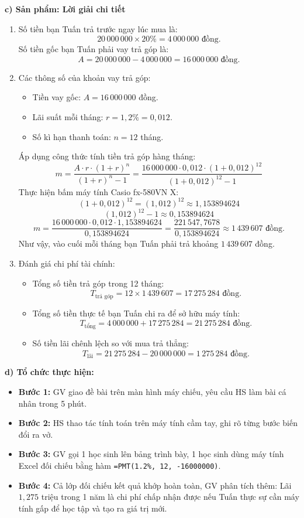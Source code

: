 \documentclass[12pt, a4paper]{article}
\begin{document}
\noindent \textbf{c) Sản phẩm: Lời giải chi tiết}
\begin{enumerate}
    \item Số tiền bạn Tuấn trả trước ngay lúc mua là:
    $$20\,000\,000 \times 20\% = 4\,000\,000\text{ đồng.}$$
    Số tiền gốc bạn Tuấn phải vay trả góp là:
    $$A = 20\,000\,000 - 4\,000\,000 = 16\,000\,000\text{ đồng.}$$
    \item Các thông số của khoản vay trả góp:
    \begin{itemize}
        \item Tiền vay gốc: $A = 16\,000\,000$ đồng.
        \item Lãi suất mỗi tháng: $r = 1{,}2\% = 0{,}012$.
        \item Số kì hạn thanh toán: $n = 12$ tháng.
    \end{itemize}
    Áp dụng công thức tính tiền trả góp hàng tháng:
    $$m = \dfrac{A \cdot r \cdot (1+r)^n}{(1+r)^n - 1} = \dfrac{16\,000\,000 \cdot 0{,}012 \cdot (1 + 0{,}012)^{12}}{(1 + 0{,}012)^{12} - 1}$$
    Thực hiện bấm máy tính Casio fx-580VN X:
    $$(1 + 0{,}012)^{12} = (1{,}012)^{12} \approx 1{,}153894624$$
    $$(1{,}012)^{12} - 1 \approx 0{,}153894624$$
    $$m = \dfrac{16\,000\,000 \cdot 0{,}012 \cdot 1{,}153894624}{0{,}153894624} = \dfrac{221\,547{,}7678}{0{,}153894624} \approx 1\,439\,607\text{ đồng.}$$
    Như vậy, vào cuối mỗi tháng bạn Tuấn phải trả khoảng $1\,439\,607$ đồng.
    \item Đánh giá chi phí tài chính:
    \begin{itemize}
        \item Tổng số tiền trả góp trong 12 tháng:
        $$T_{\text{trả góp}} = 12 \times 1\,439\,607 = 17\,275\,284\text{ đồng.}$$
        \item Tổng số tiền thực tế bạn Tuấn chi ra để sở hữu máy tính:
        $$T_{\text{tổng}} = 4\,000\,000 + 17\,275\,284 = 21\,275\,284\text{ đồng.}$$
        \item Số tiền lãi chênh lệch so với mua trả thẳng:
        $$T_{\text{lãi}} = 21\,275\,284 - 20\,000\,000 = 1\,275\,284\text{ đồng.}$$
    \end{itemize}
\end{enumerate}

\noindent \textbf{d) Tổ chức thực hiện:}
\begin{itemize}
    \item \textbf{Bước 1:} GV giao đề bài trên màn hình máy chiếu, yêu cầu HS làm bài cá nhân trong 5 phút.
    \item \textbf{Bước 2:} HS thao tác tính toán trên máy tính cầm tay, ghi rõ từng bước biến đổi ra vở.
    \item \textbf{Bước 3:} GV gọi 1 học sinh lên bảng trình bày, 1 học sinh dùng máy tính Excel đối chiếu bằng hàm \texttt{=PMT(1.2\%, 12, -16000000)}.
    \item \textbf{Bước 4:} Cả lớp đối chiếu kết quả khớp hoàn toàn, GV phân tích thêm: Lãi $1{,}275$ triệu trong 1 năm là chi phí chấp nhận được nếu Tuấn thực sự cần máy tính gấp để học tập và tạo ra giá trị mới.
\end{itemize}
\end{document}

